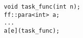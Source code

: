 
  \begin{lstlisting}[mathescape]
void task_func(int n);
ff::para<int> a;
...
a[e](task_func);
  \end{lstlisting}

